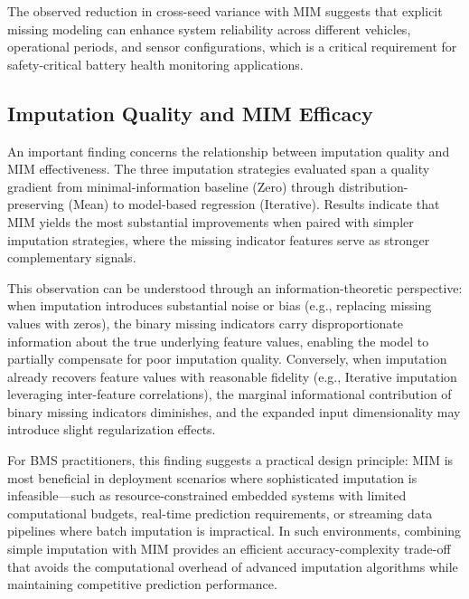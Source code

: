 \documentclass[5p,times]{elsarticle}
\begin{document}
The observed reduction in cross-seed variance with MIM suggests that explicit missing modeling can enhance system reliability across different vehicles, operational periods, and sensor configurations, which is a critical requirement for safety-critical battery health monitoring applications.

\subsection{Imputation Quality and MIM Efficacy}\label{sec:imputation_quality}

An important finding concerns the relationship between imputation quality and MIM effectiveness. The three imputation strategies evaluated span a quality gradient from minimal-information baseline (Zero) through distribution-preserving (Mean) to model-based regression (Iterative). Results indicate that MIM yields the most substantial improvements when paired with simpler imputation strategies, where the missing indicator features serve as stronger complementary signals.

This observation can be understood through an information-theoretic perspective: when imputation introduces substantial noise or bias (e.g., replacing missing values with zeros), the binary missing indicators carry disproportionate information about the true underlying feature values, enabling the model to partially compensate for poor imputation quality. Conversely, when imputation already recovers feature values with reasonable fidelity (e.g., Iterative imputation leveraging inter-feature correlations), the marginal informational contribution of binary missing indicators diminishes, and the expanded input dimensionality may introduce slight regularization effects.

For BMS practitioners, this finding suggests a practical design principle: MIM is most beneficial in deployment scenarios where sophisticated imputation is infeasible---such as resource-constrained embedded systems with limited computational budgets, real-time prediction requirements, or streaming data pipelines where batch imputation is impractical. In such environments, combining simple imputation with MIM provides an efficient accuracy-complexity trade-off that avoids the computational overhead of advanced imputation algorithms while maintaining competitive prediction performance.

\end{document}
